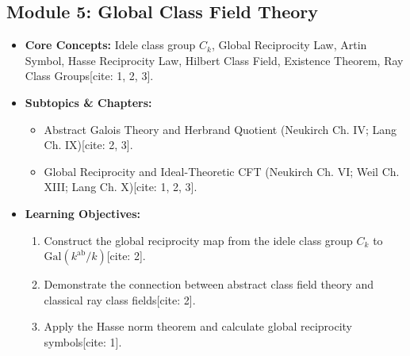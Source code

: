 \documentclass[11pt,a4paper]{article}
\begin{document}
\subsection*{Module 5: Global Class Field Theory}
\begin{itemize}[leftmargin=*]
    \item \textbf{Core Concepts:} Idele class group $C_k$, Global Reciprocity Law, Artin Symbol, Hasse Reciprocity Law, Hilbert Class Field, Existence Theorem, Ray Class Groups[cite: 1, 2, 3].
    \item \textbf{Subtopics \& Chapters:}
    \begin{itemize}
        \item Abstract Galois Theory and Herbrand Quotient (Neukirch Ch. IV; Lang Ch. IX)[cite: 2, 3].
        \item Global Reciprocity and Ideal-Theoretic CFT (Neukirch Ch. VI; Weil Ch. XIII; Lang Ch. X)[cite: 1, 2, 3].
    \end{itemize}
    \item \textbf{Learning Objectives:}
    \begin{enumerate}
        \item Construct the global reciprocity map from the idele class group $C_k$ to $\text{Gal}(k^{\text{ab}}/k)$[cite: 2].
        \item Demonstrate the connection between abstract class field theory and classical ray class fields[cite: 2].
        \item Apply the Hasse norm theorem and calculate global reciprocity symbols[cite: 1].
    \end{enumerate}
\end{itemize}
\end{document}
